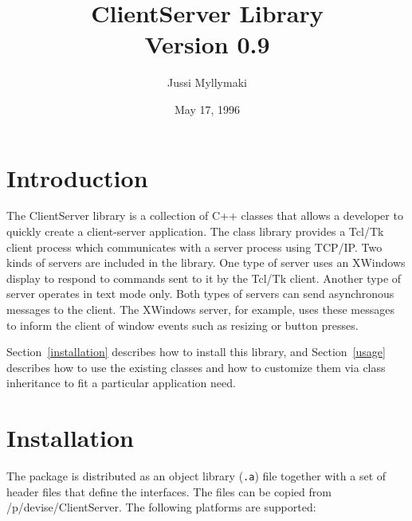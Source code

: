 


\author{Jussi Myllymaki}
\date{May 17, 1996}
\title{ClientServer Library\\{\small Version 0.9}}
\maketitle

\section{Introduction}

The ClientServer library is a collection of C++ classes that allows a
developer to quickly create a client-server application. The class
library provides a Tcl/Tk client process which communicates with a
server process using TCP/IP. Two kinds of servers are included in the
library. One type of server uses an XWindows display to respond to
commands sent to it by the Tcl/Tk client. Another type of server
operates in text mode only. Both types of servers can send
asynchronous messages to the client. The XWindows server, for example,
uses these messages to inform the client of window events such as
resizing or button presses.

Section~\ref{installation} describes how to install this library, and
Section~\ref{usage} describes how to use the existing classes and how
to customize them via class inheritance to fit a particular
application need.

\section{Installation\label{installation}}

The package is distributed as an object library ({\tt .a}) file
together with a set of header files that define the interfaces. The
files can be copied from /p/devise/ClientServer. The following
platforms are supported:

